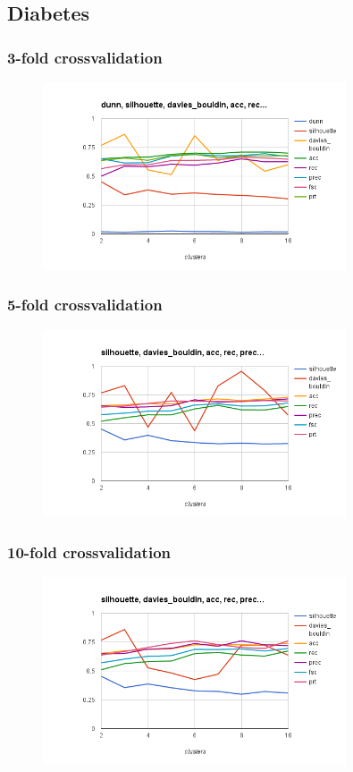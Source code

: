 \documentclass{article}
\begin{document}
\subsection{Diabetes}
\subsubsection{3-fold crossvalidation}
\begin{figure}[p]
    \centering
    \includegraphics[width=0.8\textwidth]{pam_diabetes.arff_3}
\end{figure}
\subsubsection{5-fold crossvalidation}
\begin{figure}[p]
    \centering
    \includegraphics[width=0.8\textwidth]{pam_diabetes.arff_5}
\end{figure}
\subsubsection{10-fold crossvalidation}
\begin{figure}[p]
    \centering
    \includegraphics[width=0.8\textwidth]{pam_diabetes.arff_10}
\end{figure}
\end{document}
